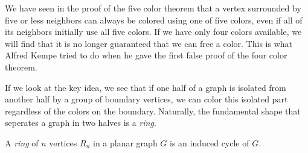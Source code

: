 We have seen in the proof of the five color theorem that a vertex surrounded by five or less neighbors can always be colored using one of five colors, even if all of its neighbors initially use all five colors. If we have only four colors available, we will find that it is no longer guaranteed that we can free a color. This is what Alfred Kempe tried to do when he gave the first false proof of the four color theorem.

If we look at the key idea, we see that if one half of a graph is isolated from another half by a group of boundary vertices, we can color this isolated part regardless of the colors on the boundary. Naturally, the fundamental shape that seperates a graph in two halves is a \textit{ring}.

\begin{definition}
    A \emph{ring} of $n$ vertices $R_n$ in a planar graph $G$ is an induced cycle of $G$.
\end{definition}

